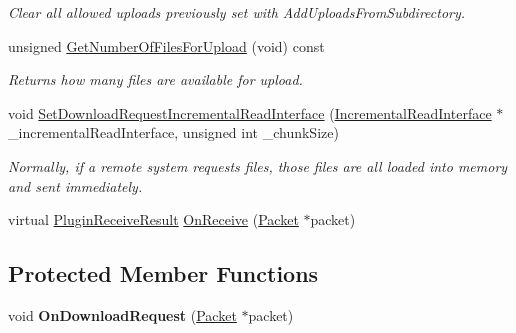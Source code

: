 \begin{DoxyCompactItemize}
\begin{DoxyCompactList}\small\item\em Clear all allowed uploads previously set with Add\-Uploads\-From\-Subdirectory. \end{DoxyCompactList}\item 
unsigned \hyperlink{class_rak_net_1_1_directory_delta_transfer_a0a9eeead84a71cb7d9e43da203b7a5f9}{Get\-Number\-Of\-Files\-For\-Upload} (void) const 
\begin{DoxyCompactList}\small\item\em Returns how many files are available for upload. \end{DoxyCompactList}\item 
void \hyperlink{class_rak_net_1_1_directory_delta_transfer_a2b004fdb9582c2353cc4443b1c8d92b3}{Set\-Download\-Request\-Incremental\-Read\-Interface} (\hyperlink{class_rak_net_1_1_incremental_read_interface}{Incremental\-Read\-Interface} $\ast$\-\_\-incremental\-Read\-Interface, unsigned int \-\_\-chunk\-Size)
\begin{DoxyCompactList}\small\item\em Normally, if a remote system requests files, those files are all loaded into memory and sent immediately. \end{DoxyCompactList}\item 
virtual \hyperlink{group___p_l_u_g_i_n___i_n_t_e_r_f_a_c_e___g_r_o_u_p_ga89998adaafb29e5d879113b992161085}{Plugin\-Receive\-Result} \hyperlink{class_rak_net_1_1_directory_delta_transfer_a7d6b9b72ba95e994d42841720d29d0a9}{On\-Receive} (\hyperlink{struct_rak_net_1_1_packet}{Packet} $\ast$packet)
\end{DoxyCompactItemize}
\subsection*{Protected Member Functions}
\begin{DoxyCompactItemize}
\item 
\hypertarget{class_rak_net_1_1_directory_delta_transfer_a4782b43eea9cac639823816001e0ea5d}{void {\bfseries On\-Download\-Request} (\hyperlink{struct_rak_net_1_1_packet}{Packet} $\ast$packet)}\label{class_rak_net_1_1_directory_delta_transfer_a4782b43eea9cac639823816001e0ea5d}

\end{DoxyCompactItemize}
